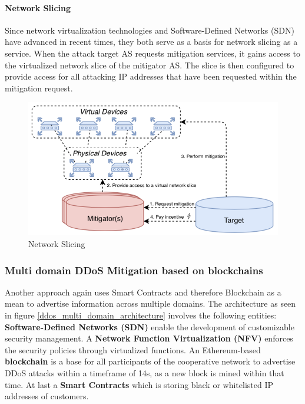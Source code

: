 \paragraph{Network Slicing}
Since network virtualization technologies and Software-Defined Networks (SDN) have advanced in recent times, they both serve as a basis for network slicing as a service. When the attack target AS requests mitigation services, it gains access to the virtualized network slice of the mitigator AS. The slice is then configured to provide access for all attacking IP addresses that have been requested within the mitigation request.
\begin{figure}[ht]
  \begin{center}
  \includegraphics[scale=0.5]{Talk7/img/ddos/cooperative_network_network_slicing}
  \end{center}
  \caption{Network Slicing}
  \label{ddos_network_slicing}
\end{figure}


\subsubsection{Multi domain DDoS Mitigation based on blockchains}
Another approach again uses Smart Contracts and therefore Blockchain as a mean to advertise information across multiple domains. The architecture as seen in figure \ref{ddos_multi_domain_architecture} involves the following entities: \textbf{Software-Defined Networks (SDN)} enable the development of customizable security management. A \textbf{Network Function Virtualization (NFV)} enforces the security policies through virtualized functions. An Ethereum-based \textbf{blockchain} is a base for all participants of the cooperative network to advertise DDoS attacks within a timeframe of 14s, as a new block is mined within that time. At last a \textbf{Smart Contracts} which is storing black or whitelisted IP addresses of customers.

